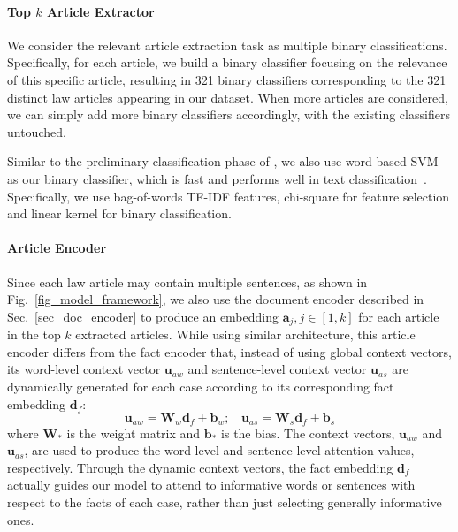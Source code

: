 \paragraph{Top $k$ Article Extractor}
\label{sec_article_extractor}
We consider the relevant article extraction task as multiple binary classifications. Specifically, for each article, we build a binary classifier focusing on the relevance of this specific article, resulting in 321 binary classifiers corresponding to the 321 distinct law articles 
appearing in our dataset.
When more articles are considered,
we can simply add more binary classifiers accordingly, with the existing classifiers untouched.

Similar to the preliminary classification phase of \cite{liu2015predicting},
we also use word-based SVM as our binary classifier, which is fast and performs well in text classification~\cite{joachims2002learning,wang2012baselines}. Specifically, we use bag-of-words TF-IDF features, chi-square for feature selection and linear kernel for binary classification. 


\paragraph{Article Encoder}
\label{sec_article_encoder}
Since each law article may contain multiple sentences, 
as shown in Fig.~\ref{fig_model_framework}, we also use the document encoder described in Sec.~\ref{sec_doc_encoder} to produce an embedding $\mathbf{a}_j, j\in[1, k]$ for each article in the top $k$ extracted articles. 
While using similar architecture, this article encoder differs from the fact encoder that, instead of using global context vectors, its word-level context vector $\mathbf{u}_{aw}$ and sentence-level context vector $\mathbf{u}_{as}$ are dynamically generated  for each case according to its corresponding fact embedding $\mathbf{d}_f$:
\begin{equation}
\mathbf{u}_{aw} = \mathbf{W}_w \mathbf{d}_f + \mathbf{b}_w;\ \ \ \ \mathbf{u}_{as} = \mathbf{W}_s \mathbf{d}_f + \mathbf{b}_s
\label{eq_dynamic_context_vec}
\end{equation}
where $\mathbf{W_*}$ is the weight matrix and $\mathbf{b_*}$ is the bias. 
The context vectors, $\mathbf{u}_{aw}$ and $\mathbf{u}_{as}$, are used to produce the word-level and sentence-level attention values,  respectively.
Through the dynamic context vectors, the fact embedding $\mathbf{d}_f$ actually guides our model to attend to informative words or sentences with respect to the facts of each case, rather than just selecting generally informative ones.



